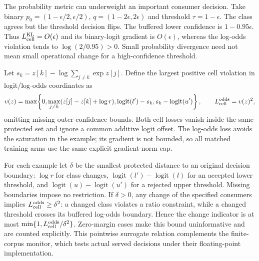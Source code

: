 The probability metric can underweight an important consumer decision.
Take binary $p_0=(1-\epsilon/2,\epsilon/2)$, $q=(1-2\epsilon,2\epsilon)$ and
threshold $\tau=1-\epsilon$. The class agrees but the threshold decision flips.
The buffered lower confidence is $1-0.95\epsilon$. Thus
$L_{\rm cell}^{\rm KL}=O(\epsilon)$ and its binary-logit gradient is
$O(\epsilon)$, whereas the log-odds violation tends to
$\log(2/0.95)>0$. Small probability divergence need not mean small operational
change for a high-confidence threshold.

Let $s_k=z[k]-\log\sum_{j\ne k}\exp z[j]$. Define the largest positive cell
violation in logit/log-odds coordinates as
\begin{equation}
v(z)=\max\!\left\{0,\max_{j\ne k}(z[j]-z[k]+\log r),
\operatorname{logit}(l')-s_k,s_k-\operatorname{logit}(u')\right\},
\qquad L_{\rm cell}^{\rm odds}=v(z)^2,
\end{equation}
omitting missing outer confidence bounds. Both cell losses vanish inside the
same protected set and ignore a common additive logit offset. The log-odds
loss avoids the saturation in the example; its gradient is not bounded, so
all matched training arms use the same explicit gradient-norm cap.

For each example let $\delta$ be the smallest protected distance to
an original decision boundary: $\log r$ for class changes,
$\operatorname{logit}(l')-\operatorname{logit}(l)$ for an accepted lower
threshold, and $\operatorname{logit}(u)-\operatorname{logit}(u')$ for a
rejected upper threshold. Missing boundaries impose no restriction. If
$\delta>0$, any change of the specified consumers implies
$L_{\rm cell}^{\rm odds}\ge\delta^2$: a changed class violates a ratio
constraint, while a changed threshold crosses its buffered log-odds boundary.
Hence the change indicator is at most
$\min\{1,L_{\rm cell}^{\rm odds}/\delta^2\}$.
Zero-margin cases make this bound uninformative and are counted explicitly.
This pointwise surrogate relation complements the finite-corpus monitor,
which tests actual served decisions under their floating-point implementation.
